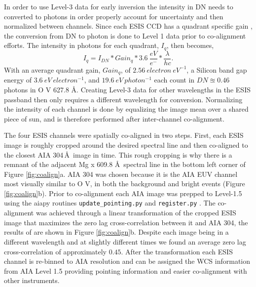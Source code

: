     
     	In order to use Level-3 data for early inversion the intensity in DN needs to  converted to photons in order properly account for uncertainty and then normalized between channels.
   		Since each ESIS CCD has a quadrant specific gain \citep{ESIS}, the conversion from DN to photon is done to Level 1 data prior to co-alignment efforts.
   		The intensity in photons for each quadrant, $I_q$, then becomes,
   		\begin{equation}
	   		I_q = I_{DN} * Gain_q * 3.6\ \frac{eV}{e^{-}} * \frac{\lambda}{hc}.
   		\end{equation}
   		With an average quadrant gain, $Gain_q$, of $2.56\ electron\ eV^{-1}$, a Silicon band gap energy of $3.6\ eV\ electron^{-1}$, and $19.6\ eV\ photon^{-1}$ each count in $DN \approxeq 0.46$ photons in O V 627.8 \AA .
   		Creating Level-3 data for other wavelengths in the ESIS passband then only requires a different wavelength for conversion.
   		Normalizing the intensity of each channel is done by equalizing the image mean over a shared piece of sun, and is therefore performed after inter-channel co-alignment.
   		
   		The four ESIS channels were spatially co-aligned in two steps.  
   		First, each ESIS image is roughly cropped around the desired spectral line and then co-aligned to the closest AIA 304\,\AA\ image in time.
   		This rough cropping is why there is a remnant of the adjacent Mg {\sc x} 609.8 \AA \ spectral line in the bottom left corner of Figure \ref{fig:coalign}a.
   		AIA 304 was chosen because it is the AIA EUV channel most visually similar to O V, in both the background and bright events (Figure \ref{fig:coalign}b).
   		Prior to co-alignment each AIA image was prepped to Level-1.5 using the aiapy routines \texttt{update\_pointing.py} and \texttt{register.py} \citep{aiapy}.
   		The co-alignment was achieved through a linear transformation of the cropped ESIS image that maximizes the zero lag cross-correlation between it and AIA 304, the results of are shown in Figure \ref{fig:coalign}b.
   		Despite each image being in a different wavelength and at slightly different times we found an average zero lag cross-correlation of approximately $0.45$.
   		After the transformation each ESIS channel is re-binned to AIA resolution and can be assigned the WCS information from AIA Level 1.5 providing pointing information and easier co-alignment with other instruments.

